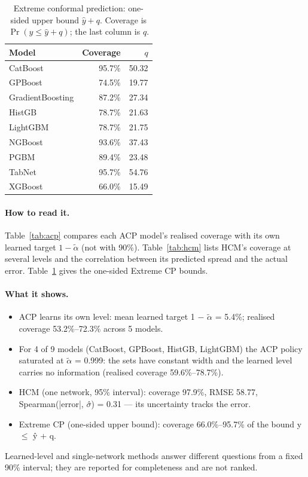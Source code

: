 \documentclass[11pt]{article}
\begin{document}
\begin{table}[t]\centering\small
\caption{Extreme conformal prediction: one-sided upper bound $\hat y+q$. Coverage is $\Pr(y\le\hat y+q)$; the last column is $q$.}\label{tab:extreme}
\begin{tabular}{lrr}\toprule Model & Coverage & $q$\\\midrule
CatBoost & 95.7\% & 50.32\\
GPBoost & 74.5\% & 19.77\\
GradientBoosting & 87.2\% & 27.34\\
HistGB & 78.7\% & 21.63\\
LightGBM & 78.7\% & 21.75\\
NGBoost & 93.6\% & 37.43\\
PGBM & 89.4\% & 23.48\\
TabNet & 95.7\% & 54.76\\
XGBoost & 66.0\% & 15.49\\
\bottomrule\end{tabular}\end{table}
\paragraph{How to read it.} Table~\ref{tab:acp} compares each ACP model's realised coverage with its own learned target $1-\tilde\alpha$ (not with 90\%). Table~\ref{tab:hcm} lists HCM's coverage at several levels and the correlation between its predicted spread and the actual error. Table~\ref{tab:extreme} gives the one-sided Extreme CP bounds.
\paragraph{What it shows.}
\begin{itemize}
\item ACP learns its own level: mean learned target 1 $-$ $\tilde\alpha$ = 5.4\%; realised coverage 53.2\%--72.3\% across 5 models.
\item For 4 of 9 models (CatBoost, GPBoost, HistGB, LightGBM) the ACP policy saturated at $\tilde\alpha$ = 0.999: the sets have constant width and the learned level carries no information (realised coverage 59.6\%--78.7\%).
\item HCM (one network, 95\% interval): coverage 97.9\%, RMSE 58.77, Spearman(|error|, $\sigma$̂) = 0.31 — its uncertainty tracks the error.
\item Extreme CP (one-sided upper bound): coverage 66.0\%--95.7\% of the bound y $\leq$ ŷ + q.
\end{itemize}
\begin{insight}[Takeaway RQ6]
Learned-level and single-network methods answer different questions from a fixed 90\% interval; they are reported for completeness and are not ranked.
\end{insight}
\end{document}
